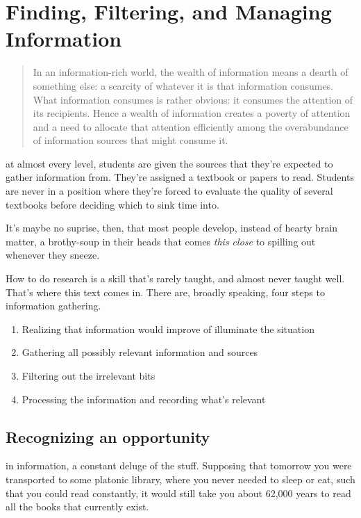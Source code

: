 \chapter{Finding, Filtering, and Managing Information}
\begin{quote}
  In an information-rich world, the wealth of information means a dearth of something else: a scarcity of whatever it is that information consumes. What information consumes is rather obvious: it consumes the attention of its recipients. Hence a wealth of information creates a poverty of attention and a need to allocate that attention efficiently among the overabundance of information sources that might consume it.
\end{quote}

 at almost every level, students are given the sources that they're expected to gather information from. They're assigned a textbook or papers to read. Students are never in a position where they're forced to evaluate the quality of several textbooks before deciding which to sink time into.

It's maybe no suprise, then, that most people develop, instead of hearty brain matter, a brothy-soup in their heads that comes \textit{this close} to spilling out whenever they sneeze.

How to do research is a skill that's rarely taught, and almost never taught well. That's where this text comes in. There are, broadly speaking, four steps to information gathering.

\begin{enumerate}
  \item Realizing that information would improve of illuminate the situation
  \item Gathering all possibly relevant information and sources
  \item Filtering out the irrelevant bits
  \item Processing the information and recording what's relevant
\end{enumerate}

\section{Recognizing an opportunity}

 in information, a constant deluge of the stuff. Supposing that tomorrow you were transported to some platonic library, where you never needed to sleep or eat, such that you could read constantly, it would still take you about 62,000 years to read all the books that currently exist. 

